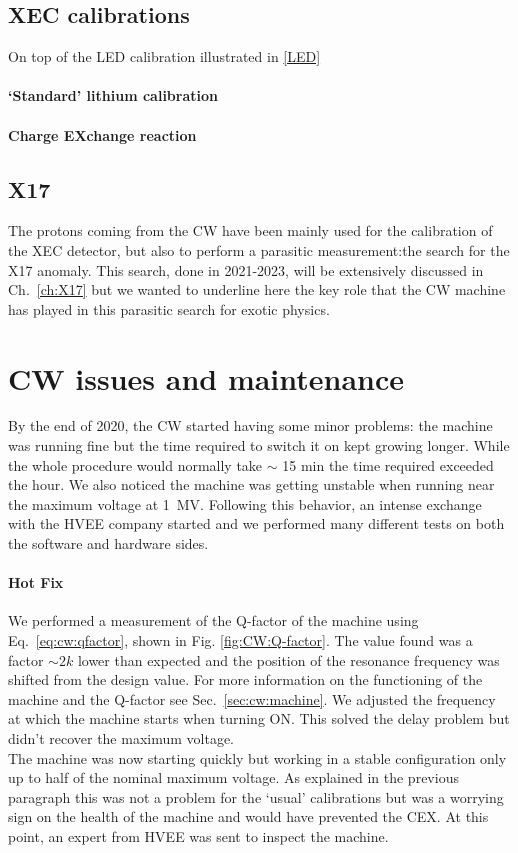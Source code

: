\begin{refsection}
    \subsection{XEC calibrations}
        On top of the LED calibration illustrated in \ref{LED} 
        \paragraph{`Standard' lithium calibration}
        \paragraph{Charge EXchange reaction}

    \subsection{X17}
        The protons coming from the CW have been mainly used for the calibration of the XEC detector, but also to perform a parasitic measurement:the search for the X17 anomaly.
        This search, done in 2021-2023, will be extensively discussed in Ch.~\ref{ch:X17} but we wanted to underline here the key role that the CW machine has played in this parasitic search for exotic physics. 

\section{CW issues and maintenance}
    By the end of 2020, the CW started having some minor problems: the machine was running fine but the time required to switch it on kept growing longer. 
    While the whole procedure would normally take $\sim$ 15 min the time required exceeded the hour.
    We also noticed the machine was getting unstable when running near the maximum voltage at \SI{1}{MV}.
    Following this behavior, an intense exchange with the HVEE company started and we performed many different tests on both the software and hardware sides.
    
    \paragraph{Hot Fix}
    We performed a measurement of the Q-factor of the machine using Eq.~\ref{eq:cw:qfactor}, shown in Fig. \ref{fig:CW:Q-factor}.  
    The value found was a factor $\sim2k$ lower than expected and the position of the resonance frequency was shifted from the design value.
    For more information on the functioning of the machine and the Q-factor see Sec.~\ref{sec:cw:machine}.
    We adjusted the frequency at which the machine starts when turning ON. 
    This solved the delay problem but didn't recover the maximum voltage. \\
    The machine was now starting quickly but working in a stable configuration only up to half of the nominal maximum voltage.
    As explained in the previous paragraph this was not a problem for the `usual' calibrations but was a worrying sign on the health of the machine and would have prevented the CEX.
    At this point, an expert from HVEE was sent to inspect the machine.


\end{refsection}
